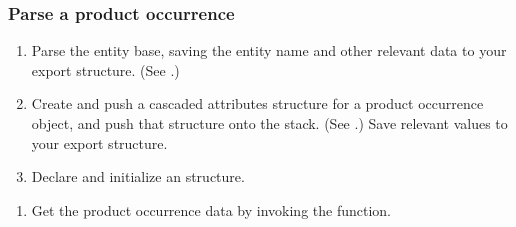 \documentclass[letterpaper,12pt,english,openany,oneside]{sphinxmanual}
\begin{document}
\subsubsection{Parse a product occurrence}
\label{\detokenize{Plugins_A3D_API:parse-a-product-occurrence}}\begin{enumerate}
%
\item {} 
Parse the entity base, saving the entity name and other relevant data to your export structure. (See .)

\item {} 
Create and push a cascaded attributes structure for a product occurrence object, and push that structure onto the stack. (See .) Save relevant values to your export structure.

\item {} 
Declare and initialize an  structure.

\end{enumerate}

\begin{sphinxVerbatim}[commandchars=\\\{\}]
 
\end{sphinxVerbatim}
\begin{enumerate}
%
\setcounter{enumi}{3}
\item {} 
Get the product occurrence data by invoking the  function.

\end{enumerate}
\end{document}
